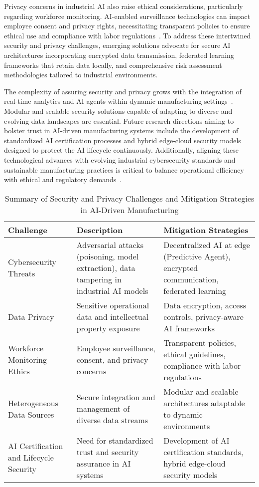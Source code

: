 \documentclass[sigconf]{acmart}
\begin{document}
Privacy concerns in industrial AI also raise ethical considerations, particularly regarding workforce monitoring. AI-enabled surveillance technologies can impact employee consent and privacy rights, necessitating transparent policies to ensure ethical use and compliance with labor regulations~\cite{ref2}. To address these intertwined security and privacy challenges, emerging solutions advocate for secure AI architectures incorporating encrypted data transmission, federated learning frameworks that retain data locally, and comprehensive risk assessment methodologies tailored to industrial environments.

The complexity of assuring security and privacy grows with the integration of real-time analytics and AI agents within dynamic manufacturing settings~\cite{ref37}. Modular and scalable security solutions capable of adapting to diverse and evolving data landscapes are essential. Future research directions aiming to bolster trust in AI-driven manufacturing systems include the development of standardized AI certification processes and hybrid edge-cloud security models designed to protect the AI lifecycle continuously. Additionally, aligning these technological advances with evolving industrial cybersecurity standards and sustainable manufacturing practices is critical to balance operational efficiency with ethical and regulatory demands~\cite{ref41}.

\begin{table*}[htbp]
\centering
\caption{Summary of Security and Privacy Challenges and Mitigation Strategies in AI-Driven Manufacturing}
\label{tab:security_privacy}
\begin{adjustbox}{max width=\textwidth}
\begin{tabular}{@{}lll@{}}
\toprule
\textbf{Challenge} & \textbf{Description} & \textbf{Mitigation Strategies} \\ \midrule
Cybersecurity Threats & Adversarial attacks (poisoning, model extraction), data tampering in industrial AI models & Decentralized AI at edge (Predictive Agent), encrypted communication, federated learning~\cite{ref37}\\
Data Privacy & Sensitive operational data and intellectual property exposure & Data encryption, access controls, privacy-aware AI frameworks~\cite{ref2}\\
Workforce Monitoring Ethics & Employee surveillance, consent, and privacy concerns & Transparent policies, ethical guidelines, compliance with labor regulations~\cite{ref2}\\
Heterogeneous Data Sources & Secure integration and management of diverse data streams & Modular and scalable architectures adaptable to dynamic environments~\cite{ref37}\\
AI Certification and Lifecycle Security & Need for standardized trust and security assurance in AI systems & Development of AI certification standards, hybrid edge-cloud security models~\cite{ref37,ref41}\\ \bottomrule
\end{tabular}
\end{adjustbox}
\end{table*}
\end{document}
